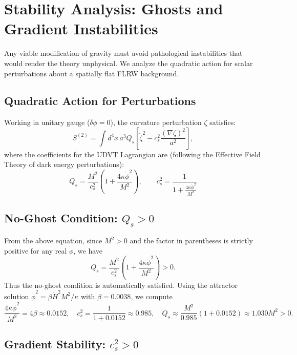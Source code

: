 \documentclass[12pt,a4paper]{book}
\theoremstyle{definition}
\theoremstyle{remark}
\begin{document}
\section{Stability Analysis: Ghosts and Gradient Instabilities}

Any viable modification of gravity must avoid pathological instabilities that would render the theory unphysical. We analyze the quadratic action for scalar perturbations about a spatially flat FLRW background.

\subsection{Quadratic Action for Perturbations}

Working in unitary gauge ($\delta\phi = 0$), the curvature perturbation $\zeta$ satisfies:
\begin{equation}
    S^{(2)} = \int d^4x \, a^3 Q_s \left[ \dot{\zeta}^2 - c_s^2 \frac{(\nabla\zeta)^2}{a^2} \right],
\end{equation}
where the coefficients for the UDVT Lagrangian are (following the Effective Field Theory of dark energy perturbations):
\begin{equation}
    \boxed{Q_s = \frac{M^2}{c_s^2}\left(1 + \frac{4\kappa\dot{\phi}^2}{M^2}\right), \qquad c_s^2 = \frac{1}{1 + \frac{4\kappa\dot{\phi}^2}{M^2}}}
\end{equation}

\subsection{No-Ghost Condition: $Q_s > 0$}

From the above equation, since $M^2 > 0$ and the factor in parentheses is strictly positive for any real $\dot{\phi}$, we have
\begin{equation}
    Q_s = \frac{M^2}{c_s^2}\left(1 + \frac{4\kappa\dot{\phi}^2}{M^2}\right) > 0.
\end{equation}
Thus the no-ghost condition is automatically satisfied. Using the attractor solution $\dot{\phi}^2 = \beta \dot{H}^2 M^2/\kappa$ with $\beta = 0.0038$, we compute
\begin{equation}
    \frac{4\kappa\dot{\phi}^2}{M^2} = 4\beta \approx 0.0152, \quad c_s^2 = \frac{1}{1+0.0152} \approx 0.985, \quad Q_s \approx \frac{M^2}{0.985}(1+0.0152) \approx 1.030 M^2 > 0.
\end{equation}

\subsection{Gradient Stability: $c_s^2 > 0$}
\end{document}
